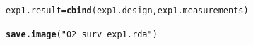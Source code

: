 \documentclass{article}\usepackage[]{graphicx}\usepackage[]{color}
\makeatletter
\newcommand{\hlstr}[1]{\textcolor[rgb]{0.192,0.494,0.8}{#1}}%
\newcommand{\hlstd}[1]{\textcolor[rgb]{0.345,0.345,0.345}{#1}}%
\newcommand{\hlkwb}[1]{\textcolor[rgb]{0.69,0.353,0.396}{#1}}%
\newcommand{\hlkwd}[1]{\textcolor[rgb]{0.737,0.353,0.396}{\textbf{#1}}}%
\newenvironment{kframe}{%
 \def\at@end@of@kframe{}%
 \ifinner\ifhmode%
  \def\at@end@of@kframe{\end{minipage}}%
  \begin{minipage}{\columnwidth}%
 \fi\fi%
 \def\FrameCommand##1{\hskip\@totalleftmargin \hskip-\fboxsep
 \colorbox{shadecolor}{##1}\hskip-\fboxsep
     \hskip-\linewidth \hskip-\@totalleftmargin \hskip\columnwidth}%
 \MakeFramed {\advance\hsize-\width
   \@totalleftmargin\z@ \linewidth\hsize
   \@setminipage}}%
 {\par\unskip\endMakeFramed%
 \at@end@of@kframe}
\newenvironment{knitrout}{}{} %
\makeatother
\begin{document}
\begin{knitrout}
\color{fgcolor}\begin{kframe}
\begin{alltt}
\hlstd{exp1.result} \hlkwb{=} \hlkwd{cbind}\hlstd{(exp1.design, exp1.measurements)}
\end{alltt}
\end{kframe}
\end{knitrout}


\begin{knitrout}
\color{fgcolor}\begin{kframe}
\begin{alltt}
\hlkwd{save.image}\hlstd{(}\hlstr{"02_surv_exp1.rda"}\hlstd{)}
\end{alltt}
\end{kframe}
\end{knitrout}
\end{document}
